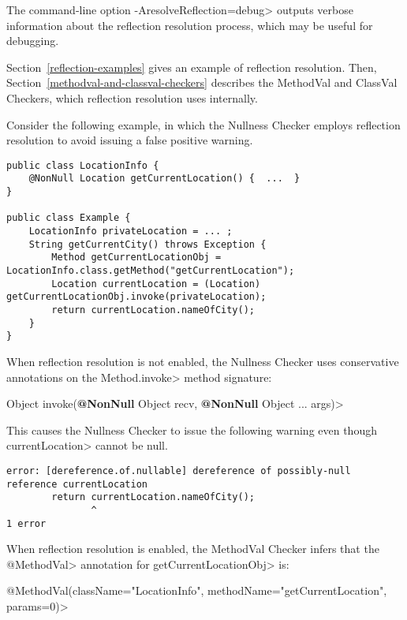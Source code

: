 The command-line option \<-AresolveReflection=debug> outputs verbose
information about the reflection resolution process, which may be useful
for debugging.

Section~\ref{reflection-examples} gives an example of reflection resolution.
Then,
Section~\ref{methodval-and-classval-checkers} describes the MethodVal
and ClassVal Checkers, which reflection resolution uses internally.



Consider the following example, in which the Nullness Checker employs
reflection resolution to avoid issuing a false positive warning.

\begin{Verbatim}
public class LocationInfo {
    @NonNull Location getCurrentLocation() {  ...  }
}

public class Example {
    LocationInfo privateLocation = ... ;
    String getCurrentCity() throws Exception {
        Method getCurrentLocationObj = LocationInfo.class.getMethod("getCurrentLocation");
        Location currentLocation = (Location) getCurrentLocationObj.invoke(privateLocation);
        return currentLocation.nameOfCity();
    }
}
\end{Verbatim}

When reflection resolution is not enabled, the Nullness Checker uses conservative
annotations on the \<Method.invoke> method signature:

\quad {} Object invoke({\bfseries @NonNull} Object recv, {\bfseries @NonNull} Object ... args)>


This causes the Nullness Checker to issue the following warning even though
\<currentLocation> cannot be null.

\begin{Verbatim}
error: [dereference.of.nullable] dereference of possibly-null reference currentLocation
        return currentLocation.nameOfCity();
               ^
1 error
\end{Verbatim}

\begin{sloppypar}
When reflection resolution is enabled, the MethodVal Checker infers that the \<@MethodVal> annotation for \<getCurrentLocationObj>  is:
\end{sloppypar}

\quad \<@MethodVal(className="LocationInfo", methodName="getCurrentLocation", params=0)>

